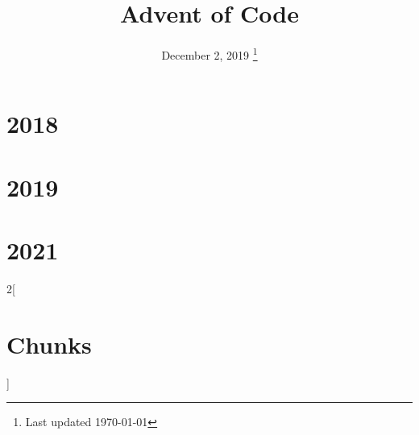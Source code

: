 \documentclass[a4paper,nobib,titlepage,xelatex]{tufte-book}
\title{Advent of Code}
\date{%
  December 2, 2019
  \thanks{Last updated \today}
}
\begin{document}
\frontmatter
\maketitle
\tableofcontents
\mainmatter
\newpage

\chapter{2018}


\chapter{2019}


\chapter{2021}


\backmatter
\newpage
\begin{multicols}{2}[\chapter*{Chunks}]
  \nowebchunks
\end{multicols}




\newpage
\listoftodos[To-Do]
\end{document}
